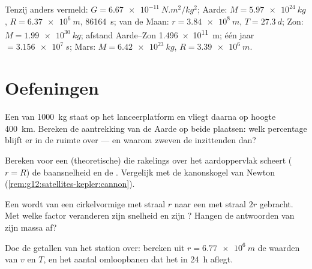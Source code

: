 \begin{remark}[Gegevenskaart]\label{rem:g12:satellites-kepler:data}
Tenzij anders vermeld: $G = \qty{6.67e-11}{N.m^2/kg^2}$; Aarde:
$M = \qty{5.97e24}{kg}$, $R = \qty{6.37e6}{m}$, 
\qty{86164}{s};  van de Maan: $r = \qty{3.84e8}{m}$,
$T = \qty{27.3}{d}$; Zon: $M = \qty{1.99e30}{kg}$; afstand Aarde--Zon
\qty{1.496e11}{m}; één jaar $= \qty{3.156e7}{s}$; Mars:
$M = \qty{6.42e23}{kg}$, $R = \qty{3.39e6}{m}$.
\end{remark}

\section{Oefeningen}

\begin{exercise}[$\star$]\label{exo:g12:satellites-kepler:1}
Een  van \qty{1000}{kg} staat op het lanceerplatform en vliegt
daarna op hoogte \qty{400}{km}. Bereken de aantrekking van de Aarde op beide
plaatsen: welk percentage blijft er in de ruimte over --- en waarom zweven de
inzittenden dan?
\end{exercise}

\begin{exercise}[$\star$]\label{exo:g12:satellites-kepler:2}
Bereken voor een (theoretische)  die rakelings over het aardoppervlak
scheert ($r = R$) de baansnelheid en de . Vergelijk met de
kanonskogel van Newton (\cref{rem:g12:satellites-kepler:cannon}).
\end{exercise}

\begin{exercise}[$\star$]\label{exo:g12:satellites-kepler:3}
Een  wordt van een cirkelvormige  met straal $r$ naar een
met straal $2r$ gebracht. Met welke factor veranderen zijn snelheid en zijn
? Hangen de antwoorden van zijn massa af?
\end{exercise}

\begin{exercise}[$\star$]\label{exo:g12:satellites-kepler:4}
Doe de getallen van het station over: bereken uit $r = \qty{6.77e6}{m}$ de
waarden van $v$ en $T$, en het aantal omloopbanen dat het in \qty{24}{h}
aflegt.
\end{exercise}

